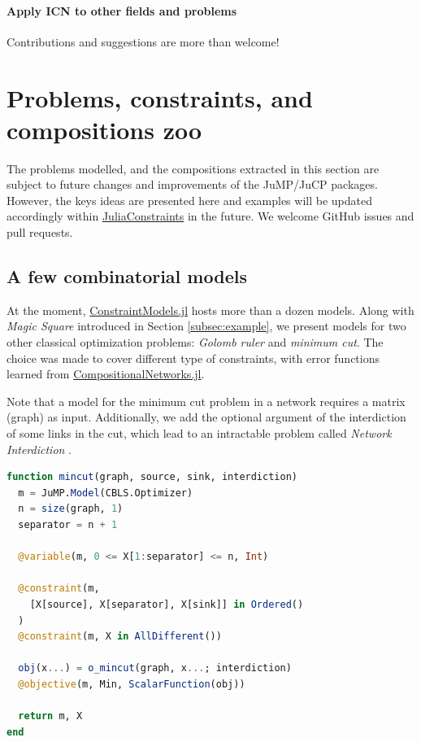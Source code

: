\documentclass{juliacon}
\newcommand{\jc}{\href{https://github.com/JuliaConstraints}{JuliaConstraints}\xspace}
\newcommand{\cnjl}{\href{https://github.com/JuliaConstraints/CompositionalNetworks.jl}{CompositionalNetworks.jl}\xspace}
\newcommand{\cmjl}{\href{https://github.com/JuliaConstraints/ConstraintModels.jl}{ConstraintModels.jl}\xspace}
\begin{document}
\paragraph*{Apply ICN to other fields and problems} Contributions and suggestions are more than welcome!

\section{Problems, constraints, and compositions zoo}
\label{sec:zoo}

The problems modelled, and the compositions extracted in this section are subject to future changes and improvements of the JuMP/JuCP packages. However, the keys ideas are presented here and examples will be updated accordingly within \jc in the future. We welcome GitHub issues and pull requests.

\subsection{A few combinatorial models}
\label{subsec:models}

At the moment, \cmjl hosts more than a dozen models. Along with \emph{Magic Square} introduced in Section \ref{subsec:example}, we present models for two other classical optimization problems: \emph{Golomb ruler} and \emph{minimum cut}. The choice was made to cover different type of constraints, with error functions learned from \cnjl.

Note that a model for the minimum cut problem in a network requires a matrix (graph) as input. Additionally, we add the optional argument of the interdiction of some links in the cut, which lead to an intractable problem called \emph{Network Interdiction} \cite{baffier2016parametric}.


\begin{lstlisting}[language = Julia]
function mincut(graph, source, sink, interdiction)
  m = JuMP.Model(CBLS.Optimizer)
  n = size(graph, 1)
  separator = n + 1

  @variable(m, 0 <= X[1:separator] <= n, Int)

  @constraint(m,
    [X[source], X[separator], X[sink]] in Ordered()
  )
  @constraint(m, X in AllDifferent())

  obj(x...) = o_mincut(graph, x...; interdiction)
  @objective(m, Min, ScalarFunction(obj))

  return m, X
end
\end{lstlisting}
\end{document}
